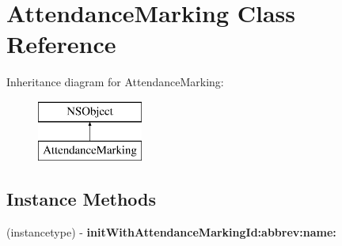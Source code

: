 \hypertarget{interface_attendance_marking}{\section{Attendance\+Marking Class Reference}
\label{interface_attendance_marking}
}
Inheritance diagram for Attendance\+Marking\+:\begin{figure}[H]
\begin{center}
\leavevmode
\includegraphics[height=2.000000cm]{interface_attendance_marking}
\end{center}
\end{figure}
\subsection*{Instance Methods}
\begin{DoxyCompactItemize}
\item 
\hypertarget{interface_attendance_marking_a6f38236cf3c6b23f42ebe44036cf8496}{(instancetype) -\/ {\bfseries init\+With\+Attendance\+Marking\+Id\+:abbrev\+:name\+:}}\label{interface_attendance_marking_a6f38236cf3c6b23f42ebe44036cf8496}

\end{DoxyCompactItemize}
